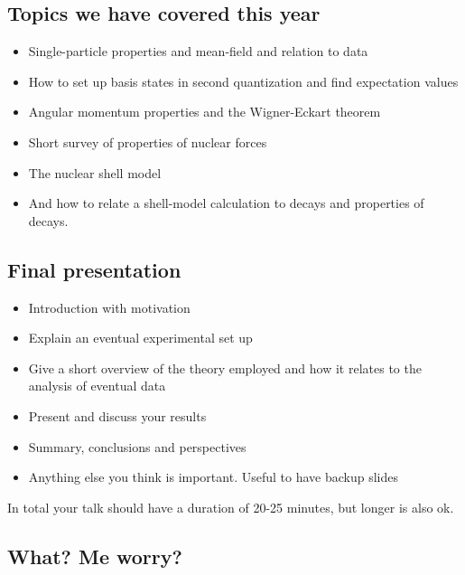 \documentclass[%
oneside,                 %
final,                   %
10pt]{article}
\begin{document}
\subsection{Topics we have covered this year}
\begin{itemize}
\item Single-particle properties and mean-field and relation to data

\item How to set up basis states in second quantization and find expectation values

\item Angular momentum properties and the Wigner-Eckart theorem

\item Short survey of properties of nuclear forces

\item The nuclear shell model

\item And how to relate a shell-model calculation to decays and properties of decays.
\end{itemize}

\noindent
\subsection{Final presentation}
\begin{itemize}
\item Introduction with motivation

\item Explain an eventual experimental set up

\item Give a short overview of the theory employed and how it relates to the analysis of eventual data

\item Present and discuss your results

\item Summary, conclusions and perspectives

\item Anything else you think is important. Useful to have backup slides
\end{itemize}

\noindent
In total your talk should have a duration of 20-25 minutes, but longer is also ok. 

\subsection{What? Me worry?}
\end{document}
